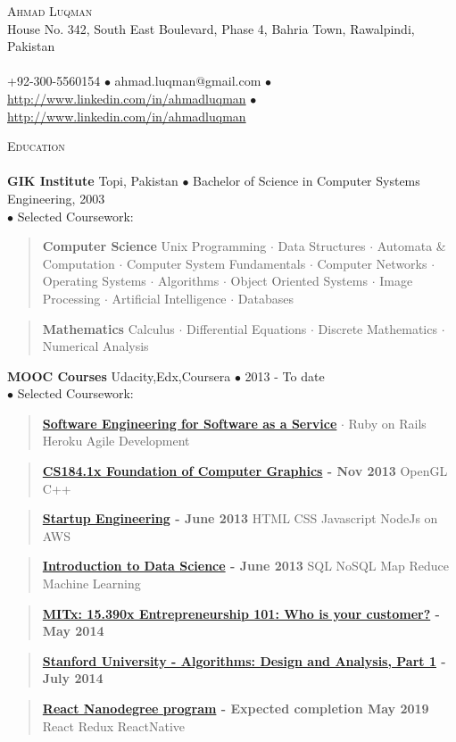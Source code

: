 \documentclass{article}
\newcommand{\area}[2]{\vspace*{-9pt} \begin{verse}\textbf{#1}   #2 \end{verse}  }
\newcommand{\lineunder}{\vspace*{-8pt} \\ \hspace*{-18pt} \hrulefill \\}
\newcommand{\header}[1]{{\hspace*{-15pt}\vspace*{6pt} \textsc{#1}} \vspace*{-6pt} \lineunder}
\newcommand{\contact}[3]{
\vspace*{-8pt}
\begin{center}
{\LARGE \scshape {#1}}\\
#2 \lineunder 
#3
\end{center}
\vspace*{-8pt}
}
\newcommand{\schoolwithcourses}[4]{
 \textbf{#1} #2 $\bullet$ #3\\ 
#4 $\bullet$  Selected Coursework:\\
\vspace*{5pt}
}
\begin{document}
\small
\smallskip
\vspace*{-44pt}

\contact{Ahmad Luqman}
{House No. 342, South East Boulevard, Phase 4, Bahria Town, Rawalpindi, Pakistan}
{+92-300-5560154 $\bullet$ ahmad.luqman@gmail.com  $\bullet$\url{http://www.linkedin.com/in/ahmadluqman} $\bullet$\url{http://www.linkedin.com/in/ahmadluqman}}

\header{Education}

\schoolwithcourses{GIK Institute}{Topi, Pakistan}{Bachelor of Science in Computer Systems Engineering, 2003}
{}
	\area{Computer Science}{ Unix Programming $\cdot$ Data Structures $\cdot$ Automata \& Computation $\cdot$ Computer System Fundamentals $\cdot$ Computer Networks $\cdot$ Operating Systems $\cdot$
 Algorithms $\cdot$ Object Oriented Systems $\cdot$ Image Processing $\cdot$
Artificial Intelligence $\cdot$ Databases}
	\area{Mathematics}{Calculus $\cdot$ Differential Equations $\cdot$ Discrete Mathematics $\cdot$ Numerical Analysis}
\schoolwithcourses{MOOC Courses}{Udacity,Edx,Coursera}{2013 - To date}
{}
	\area{\href{https://www.class-central.com/mooc/305/coursera-software-as-a-service}{Software Engineering for Software as a Service}}{ $\cdot$ Ruby on Rails Heroku Agile Development}
	\area{\href{https://www.edx.org/course/uc-berkeleyx/uc-berkeleyx-cs-184-1x-foundations-1003}{CS184.1x Foundation of Computer Graphics} - Nov 2013}{ OpenGL C++}
	\area{\href{https://www.coursera.org/course/startup}{Startup Engineering} - June 2013}{ HTML CSS Javascript NodeJs on AWS}
	\area{\href{https://www.coursera.org/course/datasci}{Introduction to Data Science} - June 2013}{SQL NoSQL Map Reduce Machine Learning}
	\area{\href{https://class.coursera.org/hetero-002}{MITx: 15.390x Entrepreneurship 101: Who is your customer?} - May 2014}{}
	\area{\href{https://www.class-central.com/course/coursera-algorithms-design-and-analysis-part-1-374}{Stanford University - Algorithms: Design and Analysis, Part 1} - July 2014}{}
	\area{\href{https://www.udacity.com/course/react-nanodegree--nd019}{React Nanodegree program} - Expected completion May 2019}{ React Redux ReactNative}
\end{document}
